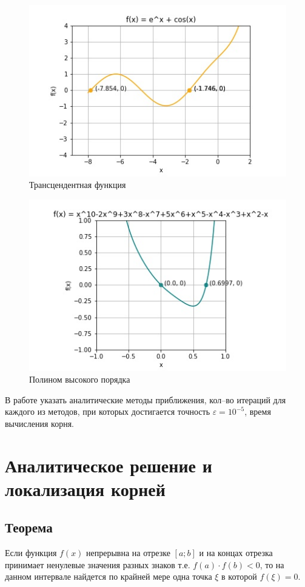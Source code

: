\documentclass[a4paper,12pt]{extarticle}
\begin{document}
    \begin{figure}[h!]
        \centering
        \includegraphics[height=0.5\linewidth]{2.jpg}
        \caption{Трансцендентная функция}
        \label{fig:res2}

    \end{figure}

    \begin{figure}[h!]
        \centering
        \includegraphics[height=0.5\linewidth]{3.jpg}
        \caption{Полином высокого порядка}
        \label{fig:res3}
    \end{figure}



    \newpage


    \noindent
    В работе указать аналитические методы приближения, кол--во итераций для каждого из методов, при которых достигается точность $\varepsilon = 10^{-5}$, время вычисления корня.
    \section{Аналитическое решение и локализация корней}

    \subsection{Теорема}
    Если функция $f(x)$ непрерывна на отрезке $[a; b]$ и на концах отрезка принимает ненулевые значения разных знаков т.е. $f(a)\cdot f(b) < 0$, то на данном интервале найдется по
    крайней мере одна точка $\xi$ в которой $f(\xi) = 0$.
\end{document}
